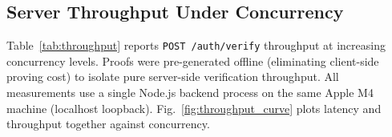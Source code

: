 \documentclass[journal,twoside,10pt]{IEEEtran}
\begin{document}
\subsection{Server Throughput Under Concurrency}

Table~\ref{tab:throughput} reports \texttt{POST /auth/verify} throughput
at increasing concurrency levels. Proofs were pre-generated offline
(eliminating client-side proving cost) to isolate pure server-side
verification throughput. All measurements use a single Node.js backend
process on the same Apple M4 machine (localhost loopback).
Fig.~\ref{fig:throughput_curve} plots latency and throughput together
against concurrency.

\begin{table}[!t]
\renewcommand{\arraystretch}{1.2}
\caption{Server Verification Throughput ($n=10$ bursts/level, Apple M4,
single Node.js process, localhost. T14 50\,ms pad applies to every
request.)}
\label{tab:throughput}
\centering
{}
\end{table}
\end{document}
